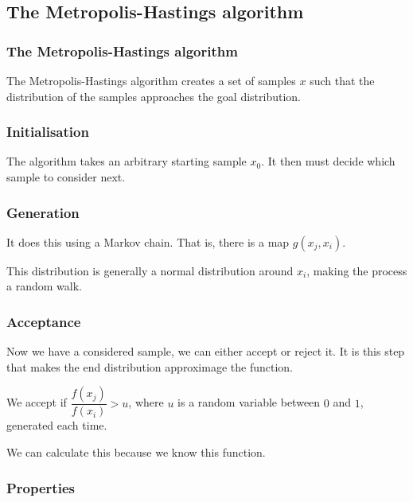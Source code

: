 
\subsection{The Metropolis-Hastings algorithm}

\subsubsection{The Metropolis-Hastings algorithm}

The Metropolis-Hastings algorithm creates a set of samples \(x\) such that the distribution of the samples approaches the goal distribution.

\subsubsection{Initialisation}

The algorithm takes an arbitrary starting sample \(x_0\). It then must decide which sample to consider next.

\subsubsection{Generation}

It does this using a Markov chain. That is, there is a map \(g(x_j, x_i)\).

This distribution is generally a normal distribution around \(x_i\), making the process a random walk.

\subsubsection{Acceptance}

Now we have a considered sample, we can either accept or reject it. It is this step that makes the end distribution approximage the function.

We accept if \(\dfrac{f(x_j)}{f(x_i)}>u\), where \(u\) is a random variable between \(0\) and \(1\), generated each time.

We can calculate this because we know this function.

\subsubsection{Properties}



